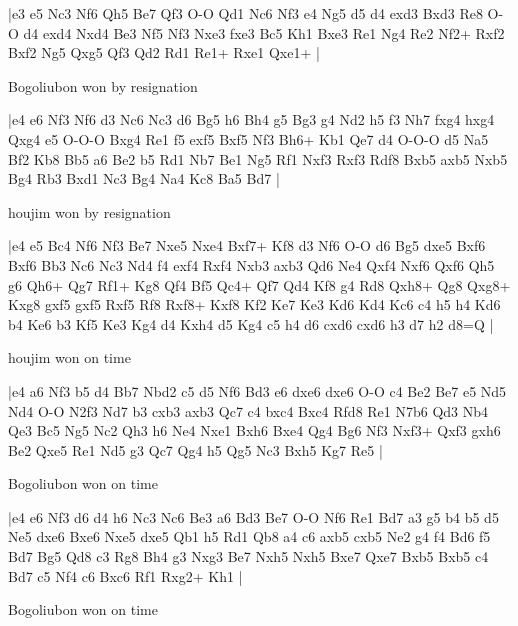 \makegametitle
|e3 e5 Nc3 Nf6 Qh5 Be7 Qf3 O-O Qd1 Nc6 Nf3 e4 Ng5 d5 d4 exd3 Bxd3 Re8 O-O d4 exd4 Nxd4 Be3 Nf5 Nf3 Nxe3 fxe3 Bc5 Kh1 Bxe3 Re1 Ng4 Re2 Nf2+ Rxf2 Bxf2 Ng5 Qxg5 Qf3 Qd2 Rd1 Re1+ Rxe1 Qxe1+  |

\showboard

Bogoliubon won by resignation

\makegametitle
|e4 e6 Nf3 Nf6 d3 Nc6 Nc3 d6 Bg5 h6 Bh4 g5 Bg3 g4 Nd2 h5 f3 Nh7 fxg4 hxg4 Qxg4 e5 O-O-O Bxg4 Re1 f5 exf5 Bxf5 Nf3 Bh6+ Kb1 Qe7 d4 O-O-O d5 Na5 Bf2 Kb8 Bb5 a6 Be2 b5 Rd1 Nb7 Be1 Ng5 Rf1 Nxf3 Rxf3 Rdf8 Bxb5 axb5 Nxb5 Bg4 Rb3 Bxd1 Nc3 Bg4 Na4 Kc8 Ba5 Bd7  |

\showboard

houjim won by resignation

\makegametitle
|e4 e5 Bc4 Nf6 Nf3 Be7 Nxe5 Nxe4 Bxf7+ Kf8 d3 Nf6 O-O d6 Bg5 dxe5 Bxf6 Bxf6 Bb3 Nc6 Nc3 Nd4 f4 exf4 Rxf4 Nxb3 axb3 Qd6 Ne4 Qxf4 Nxf6 Qxf6 Qh5 g6 Qh6+ Qg7 Rf1+ Kg8 Qf4 Bf5 Qc4+ Qf7 Qd4 Kf8 g4 Rd8 Qxh8+ Qg8 Qxg8+ Kxg8 gxf5 gxf5 Rxf5 Rf8 Rxf8+ Kxf8 Kf2 Ke7 Ke3 Kd6 Kd4 Kc6 c4 h5 h4 Kd6 b4 Ke6 b3 Kf5 Ke3 Kg4 d4 Kxh4 d5 Kg4 c5 h4 d6 cxd6 cxd6 h3 d7 h2 d8=Q  |

\showboard

houjim won on time

\makegametitle
|e4 a6 Nf3 b5 d4 Bb7 Nbd2 c5 d5 Nf6 Bd3 e6 dxe6 dxe6 O-O c4 Be2 Be7 e5 Nd5 Nd4 O-O N2f3 Nd7 b3 cxb3 axb3 Qc7 c4 bxc4 Bxc4 Rfd8 Re1 N7b6 Qd3 Nb4 Qe3 Bc5 Ng5 Nc2 Qh3 h6 Ne4 Nxe1 Bxh6 Bxe4 Qg4 Bg6 Nf3 Nxf3+ Qxf3 gxh6 Be2 Qxe5 Re1 Nd5 g3 Qc7 Qg4 h5 Qg5 Nc3 Bxh5 Kg7 Re5  |

\showboard

Bogoliubon won on time

\makegametitle
|e4 e6 Nf3 d6 d4 h6 Nc3 Nc6 Be3 a6 Bd3 Be7 O-O Nf6 Re1 Bd7 a3 g5 b4 b5 d5 Ne5 dxe6 Bxe6 Nxe5 dxe5 Qb1 h5 Rd1 Qb8 a4 c6 axb5 cxb5 Ne2 g4 f4 Bd6 f5 Bd7 Bg5 Qd8 c3 Rg8 Bh4 g3 Nxg3 Be7 Nxh5 Nxh5 Bxe7 Qxe7 Bxb5 Bxb5 c4 Bd7 c5 Nf4 c6 Bxc6 Rf1 Rxg2+ Kh1  |

\showboard

Bogoliubon won on time

